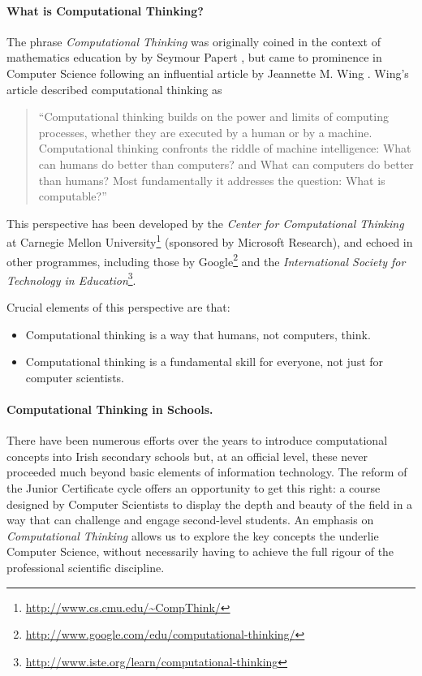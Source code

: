 \documentclass[a4paper]{article}
\begin{document}
\paragraph{What is Computational Thinking?}

The phrase \textit{Computational Thinking} was originally coined in the context of mathematics education by by Seymour Papert \cite{papert96}, but came to prominence in Computer Science following an influential article by Jeannette M. Wing \cite{wing-cacm06}.  Wing's article described computational thinking as
\begin{quotation}
``Computational thinking
builds on the power and
limits of computing
processes, whether they are executed by a human or by a
machine.  Computational thinking confronts the riddle of machine intelligence: What can humans do better than computers? and What can computers do better than humans? Most fundamentally it addresses the question: What is
computable?''
\end{quotation}


This perspective has been developed by the 
\textit{Center for Computational Thinking} at Carnegie Mellon University\footnote{\url{http://www.cs.cmu.edu/~CompThink/}}
(sponsored by Microsoft Research), and echoed in other programmes, including those by 
Google\footnote{\url{http://www.google.com/edu/computational-thinking/}} and the
\textit{International Society for Technology in Education}\footnote{\url{http://www.iste.org/learn/computational-thinking}}.

Crucial elements of this perspective are that:
\begin{itemize}
\item Computational thinking is a way that humans, not computers, think.
\item Computational thinking is a fundamental skill for
everyone, not just for computer scientists.
\end{itemize}


\paragraph{Computational Thinking in Schools.}

There have been numerous efforts over the years to introduce computational concepts into Irish secondary schools but, at an official level, these never proceeded much beyond basic elements of information technology.  The reform of the Junior Certificate cycle offers an opportunity to get this right: a course designed by Computer Scientists to display the depth and beauty of the field in a way that can challenge and engage second-level students.  An emphasis on 
\textit{Computational Thinking} allows us to explore the key concepts the underlie Computer Science, without necessarily having to achieve the full rigour of the professional scientific discipline.
\end{document}
